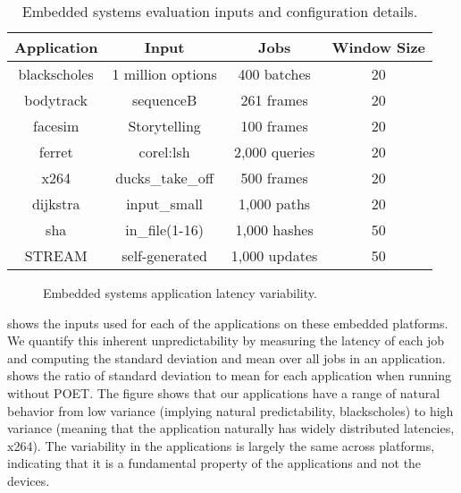 \begin{table}[t]
\small
\centering
\caption{Embedded systems evaluation inputs and configuration details.}
\begin{tabular}{cccc}
  \textbf{Application} & \textbf{Input} & \textbf{Jobs} & \textbf{Window Size} \\
  \hline
  \hline
  blackscholes   & 1 million options              & 400 batches   & 20 \\
  bodytrack      & sequenceB                      & 261 frames    & 20 \\
  facesim        & Storytelling                   & 100 frames    & 20 \\
  ferret         & corel:lsh                      & 2,000 queries & 20 \\
  x264           & ducks\_take\_off               & 500 frames    & 20 \\
  dijkstra       & input\_small                   & 1,000 paths   & 20 \\
  sha            & in\_file(1-16)                 & 1,000 hashes  & 50 \\
  STREAM         & self-generated                 & 1,000 updates & 50 \\
  \hline
  \hline
\end{tabular}
\label{tbl:poet-embedded-inputs}
\end{table}

\begin{figure}[t]
  \centering
  
  \caption{Embedded systems application latency variability.}
  \label{fig:poet-embedded-variation}
\end{figure}

 shows the inputs used for each of the applications on these embedded platforms.
We quantify this inherent unpredictability by measuring the latency of each job and computing the standard deviation and mean over all jobs in an application.
 shows the ratio of standard deviation to mean for each application when running without POET.
The figure shows that our applications have a range of natural behavior from low variance (implying natural predictability, \eg blackscholes) to high variance (meaning that the application naturally has widely distributed latencies, \eg x264).
The variability in the applications is largely the same across platforms, indicating that it is a fundamental property of the applications and not the devices.

